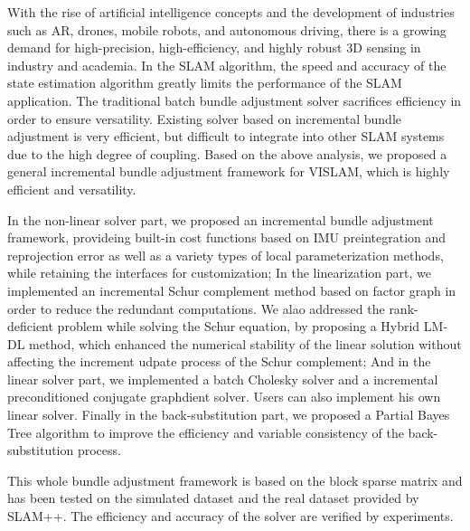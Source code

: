 \begin{englishabstract}
    With the rise of artificial intelligence concepts and the development of industries such as AR, drones, mobile robots, and autonomous driving, there is a growing demand for high-precision, high-efficiency, and highly robust 3D sensing in industry and academia. In the SLAM algorithm, the speed and accuracy of the state estimation algorithm greatly limits the performance of the SLAM application. The traditional batch bundle adjustment solver sacrifices efficiency in order to ensure versatility. Existing solver based on incremental bundle adjustment is very efficient, but difficult to integrate into other SLAM systems due to the high degree of coupling. Based on the above analysis, we proposed a general incremental bundle adjustment framework for VISLAM, which is highly efficient and versatility.

    In the non-linear solver part, we proposed an incremental bundle adjustment framework, provideing built-in cost functions based on IMU preintegration and reprojection error as well as a variety types of local parameterization methods, while retaining the interfaces for customization; In the linearization part, we implemented an incremental Schur complement method based on factor graph in order to reduce the redundant computations. We alao addressed the rank-deficient problem while solving the Schur equation, by proposing a Hybrid LM-DL method, which enhanced the numerical stability of the linear solution without affecting the increment udpate process of the Schur complement; And in the linear solver part, we implemented a batch Cholesky solver and a incremental preconditioned conjugate graphdient solver. Users can also implement his own linear solver. Finally in the back-substitution part, we proposed a Partial Bayes Tree algorithm to improve the efficiency and variable consistency of the back-substitution process.

    This whole bundle adjustment framework is based on the block sparse matrix and has been tested on the simulated dataset and the real dataset provided by SLAM++. The efficiency and accuracy of the solver are verified by experiments.

\end{englishabstract}
